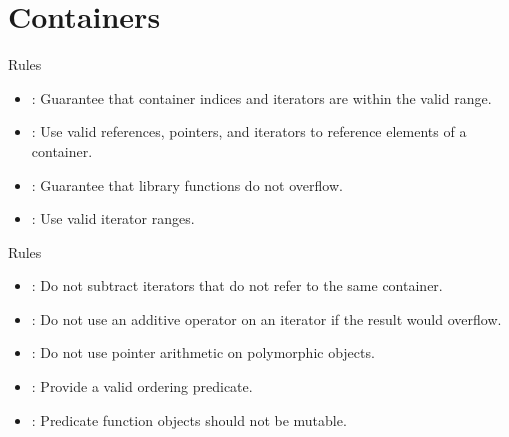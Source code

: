 \section{Containers}

\begin{frame}[t]{Rules}
\begin{itemize}
  \item {}: 
        Guarantee that container indices and iterators are within the valid range.
  \vfill
  \item {}: 
        Use valid references, pointers, and iterators to reference elements of a container.
  \vfill
  \item {}:
        Guarantee that library functions do not overflow. 
  \vfill
  \item {}: 
        Use valid iterator ranges.
\end{itemize}
\end{frame}

\begin{frame}[t]{Rules}
\begin{itemize}
  \item {}: 
        Do not subtract iterators that do not refer to the same container.
  \vfill
  \item {}:
        Do not use an additive operator on an iterator if the result would overflow. 
  \vfill
  \item {}: 
        Do not use pointer arithmetic on polymorphic objects.
  \vfill
  \item {}: 
        Provide a valid ordering predicate.
  \vfill
  \item {}: 
        Predicate function objects should not be mutable.
\end{itemize}
\end{frame}



